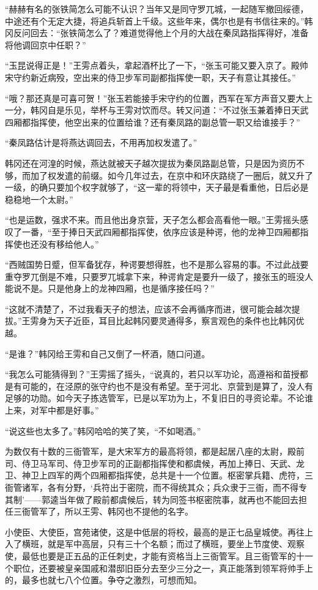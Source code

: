“赫赫有名的张铁简怎么可能不认识？当年又是同守罗兀城，一起随军撤回绥德，中途还有个无定大捷，将追兵斩首上千级。这些年来，偶尔也是有书信往来的。”韩冈反问回去：“张铁简怎么了？难道觉得他上个月的大战在秦凤路指挥得好，准备将他调回京中任职？”

“玉昆说得正是！”王雱点着头，拿起酒杯比了一下，“张玉可能又要入京了。殿帅宋守约新近病殁，空出来的侍卫步军司副都指挥使一职，天子有意让其接任。”

“哦？那还真是可喜可贺！”张玉若能接手宋守约的位置，西军在军方声音又要大上一分，韩冈自是乐见，举杯与王雱对饮而尽。转又问道：“不过张玉兼着捧日天武四厢都指挥使，他空出来的位置给谁？还有秦凤路的副总管一职又给谁接手？”

“秦凤路估计是将燕达调回去，不用再加权发遣了。”

韩冈还在河湟的时候，燕达就被天子越次提拔为秦凤路副总管，只是因为资历不够，而加了权发遣的前缀。如今几年过去，在京中和环庆路绕了一圈后，就又升了一级，的确只要加个权字就够了，“这一辈的将领中，天子最是看重他，日后必是稳稳地一个太尉。”

“也是运数，强求不来。而且他出身京营，天子怎么都会高看他一眼。”王雱摇头感叹了一番，“至于捧日天武四厢都指挥使，依序应该是种谔，他的龙神卫四厢都指挥使也还没有移给他人。”

“西贼国势日蹙，但军备犹存，种谔要想得胜，也不是那么容易的事。不过此战要重夺罗兀倒是不难，只要罗兀城拿下来，种谔肯定是要升一级了，接张玉的班没人能说不是。只是他身上的龙神四厢，也是循序接任吗？”

“这就不清楚了，不过我看天子的想法，应该不会再循序而进，很可能会越次提拔。”王雱身为天子近臣，耳目比起韩冈要灵通得多，察言观色的条件也比韩冈优越。

“是谁？”韩冈给王雱和自己又倒了一杯酒，随口问道。

“我怎么可能猜得到？”王雱摇了摇头，“说真的，若只以军功论，高遵裕和苗授都是有可能的，在泾原的张守约也不是没有希望。至于河北、京营到是算了，没人有足够的功勋。如今天子拣选管军，已是以军功为上，不复旧日的寻资论辈。不论谁上来，对军中都是好事。”

“说这些也太多了。”韩冈哈哈的笑了笑，“不如喝酒。”

为数仅有十数的三衙管军，是大宋军方的最高将领，都是起居八座的太尉，殿前司、侍卫马军司、侍卫步军司的正副都指挥使和都虞候，再加上捧日、天武、龙卫、神卫上四军的两个四厢都指挥使，总共是十一个位置。枢密掌兵籍、虎符，三衙管诸军，各有分野，‘兵符出于密院，而不得统其众；兵众隶于三衙，而不得专其制’——郭逵当年做了殿前都虞候后，转为同签书枢密院事，就再也不能回去担任三衙管军了，所以王雱、韩冈也不提他的名字。

小使臣、大使臣，宫苑诸使，这是中低层的将校，最高的是正七品皇城使。再往上入了横班，就是军中高层，只有三十个名额；而过了横班，要坐上节度使、观察使，最低也要是正五品的正任刺史，才能有资格当上三衙管军。且三衙管军的十一个职位，还要被皇亲国戚和潜邸旧臣分去至少三分之一，真正能落到领军将帅手上的，最多也就七八个位置。争夺之激烈，可想而知。

